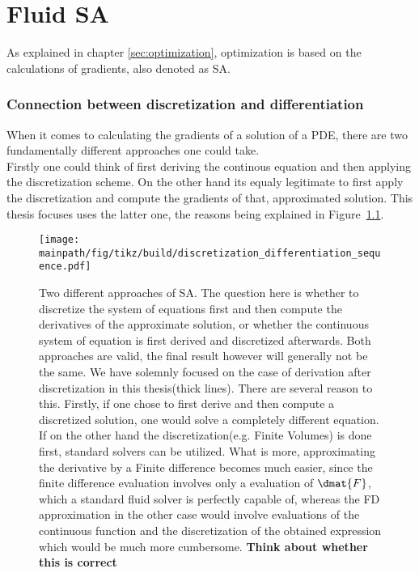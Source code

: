 \documentclass[../main.tex]{subfiles}
\begin{document}
\chapter{Fluid \acf{SA}}\label{sec:SA}
As explained in chapter \ref{sec:optimization}, optimization is based on the calculations of gradients, also denoted as \acf{SA}.

\subsection{Connection between discretization and differentiation}\label{sec:discretization_vs_differentiation}
When it comes to calculating the gradients of a solution of a PDE, there are two fundamentally different approaches one could take.\\
Firstly one could think of first deriving the continous equation and then applying the discretization scheme. On the other hand its equaly legitimate to first apply the discretization and compute the gradients of that, approximated solution. This thesis focuses uses the latter one, the reasons being explained in Figure~\ref{fig:discretization_differentiation_sequence}.


 \begin{figure}[h!]
	\begin{center}
        \texttt{[image: \\mainpath/fig/tikz/build/discretization\_differentiation\_sequence.pdf]}
        \caption[Sensitivity Analysis approaches]{Two different approaches of \ac{SA}. The question here is whether to discretize the system of equations first and then compute the derivatives of the approximate solution, or whether the continuous system of equation is first derived and discretized afterwards. Both approaches are valid, the final result however will generally not be the same. We have solemnly focused on the case of derivation after discretization in this thesis(thick lines). There are several reason to this. Firstly, if one chose to first derive and then compute a discretized solution, one would solve a completely different equation. If on the other hand the discretization(e.g. Finite Volumes) is done first, standard solvers can be utilized. What is more, approximating the derivative by a Finite difference becomes much easier, since the finite difference evaluation involves only a evaluation of $\dmat{F}$, which a standard fluid solver is perfectly capable of, whereas the \ac{FD} approximation in the other case would involve evaluations of the continuous function and the discretization of the obtained expression which would be much more cumbersome. \textbf{Think about whether this is correct} }
		\label{fig:discretization_differentiation_sequence}
    \end{center}
\end{figure}
\end{document}

